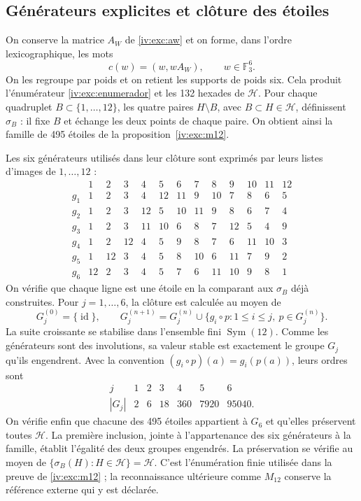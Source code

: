 \subsection{Générateurs explicites et clôture des étoiles}
\label{iv:iv:apendice-estrellas}

On conserve la matrice \(A_W\) de \eqref{iv:exc:aw} et on forme,
dans l’ordre lexicographique, les mots
\[
 c(w)=(w,wA_W),\qquad w\in\mathbb F_3^6.
\]
On les regroupe par poids et on retient les supports de poids six.
Cela produit l’énumérateur \eqref{iv:exc:enumerador} et les 132 hexades
de \(\mathcal H\). Pour chaque quadruplet \(B\subset\{1,\ldots,12\}\),
les quatre paires \(H\setminus B\), avec \(B\subset H\in\mathcal H\),
définissent \(\sigma_B\) : il fixe \(B\) et échange les deux points
de chaque paire. On obtient ainsi la famille de 495 étoiles de
la proposition~\ref{iv:exc:m12}.

Les six générateurs utilisés dans leur clôture sont exprimés par leurs listes
d’images de \(1,\ldots,12\) :
\[
\begin{array}{c|rrrrrrrrrrrr}
 &1&2&3&4&5&6&7&8&9&10&11&12\\ \hline
g_1&1&2&3&4&12&11&9&10&7&8&6&5\\
g_2&1&2&3&12&5&10&11&9&8&6&7&4\\
g_3&1&2&3&11&10&6&8&7&12&5&4&9\\
g_4&1&2&12&4&5&9&8&7&6&11&10&3\\
g_5&1&12&3&4&5&8&10&6&11&7&9&2\\
g_6&12&2&3&4&5&7&6&11&10&9&8&1
\end{array}
\]
On vérifie que chaque ligne est une étoile en la comparant aux
\(\sigma_B\) déjà construites. Pour \(j=1,\ldots,6\), la clôture
est calculée au moyen de
\[
 G_j^{(0)}=\{\operatorname{id}\},\qquad
 G_j^{(n+1)}
 =G_j^{(n)}\cup
   \{g_i\circ p:1\leq i\leq j,\ p\in G_j^{(n)}\}.
\]
La suite croissante se stabilise dans l’ensemble fini
\(\operatorname{Sym}(12)\). Comme les générateurs sont des involutions,
sa valeur stable est exactement le groupe \(G_j\) qu’ils engendrent.
Avec la convention \((g_i\circ p)(a)=g_i(p(a))\), leurs ordres sont
\[
\begin{array}{c|rrrrrr}
 j&1&2&3&4&5&6\\ \hline
 |G_j|&2&6&18&360&7920&95040 .
\end{array}
\]
On vérifie enfin que chacune des 495 étoiles appartient
à \(G_6\) et qu’elles préservent toutes \(\mathcal H\). La première inclusion,
jointe à l’appartenance des six générateurs à la famille,
établit l’égalité des deux groupes engendrés. La préservation se vérifie
au moyen de \(\{\sigma_B(H):H\in\mathcal H\}=\mathcal H\).
C’est l’énumération finie utilisée dans la preuve de
\ref{iv:exc:m12} ; la reconnaissance ultérieure comme \(M_{12}\)
conserve la référence externe qui y est déclarée.

